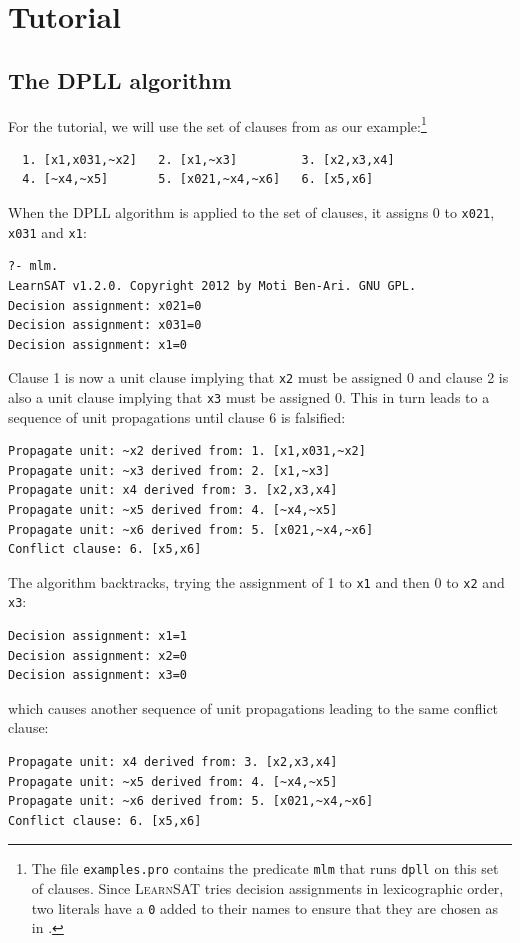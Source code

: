 \documentclass[11pt]{report}
\newcommand*{\p}[1]{\textup{\texttt{#1}}}
\newcommand*{\ls}{\textsc{LearnSAT}}
\begin{document}

\chapter{Tutorial}

\section{The DPLL algorithm}

For the tutorial, we will use the set of clauses from \cite{mlm} as our
example:\footnote{The file \p{examples.pro} contains the predicate
\p{mlm} that runs \p{dpll} on this set of clauses. Since \ls{} tries
decision assignments in lexicographic order, two literals have a \p{0}
added to their names to ensure that they are chosen as in \cite{mlm}.}

\begin{verbatim}
  1. [x1,x031,~x2]   2. [x1,~x3]         3. [x2,x3,x4]
  4. [~x4,~x5]       5. [x021,~x4,~x6]   6. [x5,x6]
\end{verbatim}

When the DPLL algorithm is applied to the set of clauses, it assigns
0 to \p{x021}, \p{x031} and \p{x1}:

\begin{verbatim}
?- mlm.
LearnSAT v1.2.0. Copyright 2012 by Moti Ben-Ari. GNU GPL.
Decision assignment: x021=0
Decision assignment: x031=0
Decision assignment: x1=0
\end{verbatim}

Clause 1 is now a unit clause implying that \p{x2} must be assigned 0
and clause 2 is also a unit clause implying that \p{x3} must be assigned
0. This in turn leads to a sequence of unit propagations until clause 6
is falsified:

\begin{verbatim}
Propagate unit: ~x2 derived from: 1. [x1,x031,~x2]
Propagate unit: ~x3 derived from: 2. [x1,~x3]
Propagate unit: x4 derived from: 3. [x2,x3,x4]
Propagate unit: ~x5 derived from: 4. [~x4,~x5]
Propagate unit: ~x6 derived from: 5. [x021,~x4,~x6]
Conflict clause: 6. [x5,x6]
\end{verbatim}

\pagebreak[3]

The algorithm backtracks, trying the assignment of 1 to \p{x1} and then
0 to \p{x2} and \p{x3}:
\begin{verbatim}
Decision assignment: x1=1
Decision assignment: x2=0
Decision assignment: x3=0
\end{verbatim}
which causes another sequence of unit propagations leading to the same
conflict clause:
\begin{verbatim}
Propagate unit: x4 derived from: 3. [x2,x3,x4]
Propagate unit: ~x5 derived from: 4. [~x4,~x5]
Propagate unit: ~x6 derived from: 5. [x021,~x4,~x6]
Conflict clause: 6. [x5,x6]
\end{verbatim}
\end{document}
